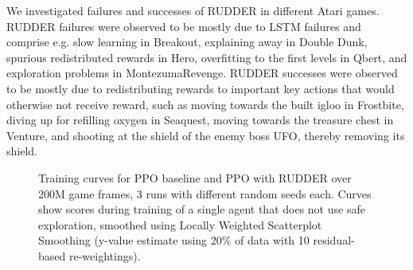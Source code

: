 \documentclass{article}
\newcommand{\figpath}{figures/}
\begin{document}
\begin{appendices}
We investigated failures and successes of RUDDER in different Atari games.
RUDDER failures were observed to be mostly due to LSTM failures and comprise e.g. slow learning in Breakout, explaining away in Double Dunk, spurious redistributed rewards in Hero, overfitting to the first levels in Qbert, and exploration problems in MontezumaRevenge.
RUDDER successes were observed to be mostly due to redistributing rewards to important key actions that would otherwise not receive reward, such as moving towards the built igloo in Frostbite, diving up for refilling oxygen in Seaquest, moving towards the treasure chest in Venture, and shooting at the shield of the enemy boss UFO, thereby removing its shield.

\begin{figure}[htp]\centering \resizebox{\textwidth}{!}{}\caption{Training curves for PPO baseline and PPO with RUDDER over 200M game frames, 3 runs with different random seeds each. Curves show scores during training of a single agent that does not use safe exploration, smoothed using Locally Weighted Scatterplot Smoothing (y-value estimate using 20\% of data with 10 residual-based re-weightings).\label{fig:atari_training}}\end{figure}





\end{appendices}
\end{document}

